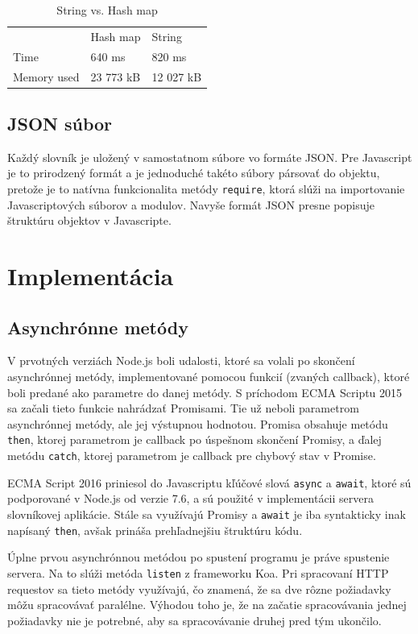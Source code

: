 \documentclass[
  digital, %
  table,   %
  lof,     %
  lot,     %
]{fithesis3}
\begin{document}
\begin{table}[]
\centering
\caption{String vs. Hash map}
\label{tab:string-hash}
\begin{tabular}{lll}
     & Hash map & String   \\
Time & 640 ms   & 820 ms   \\
Memory used & 23 773 kB & 12 027 kB
\end{tabular}
\end{table}

\subsection{JSON súbor}
Každý slovník je uložený v samostatnom súbore vo formáte JSON. Pre Javascript je to prirodzený formát a je jednoduché takéto súbory pársovať do objektu, pretože je to natívna funkcionalita metódy \texttt{require}, ktorá slúži na importovanie Javascriptových súborov a modulov. Navyše formát JSON presne popisuje štruktúru objektov v Javascripte.


\section{Implementácia}
\subsection{Asynchrónne metódy}
V prvotných verziách Node.js boli udalosti, ktoré sa volali po skončení asynchrónnej metódy, implementované pomocou funkcií (zvaných callback), ktoré boli predané ako parametre do danej metódy. S príchodom ECMA Scriptu 2015 sa začali tieto funkcie nahrádzať Promisami. Tie už neboli parametrom asynchrónnej metódy, ale jej výstupnou hodnotou. Promisa obsahuje metódu \texttt{then}, ktorej parametrom je callback po úspešnom skončení Promisy, a ďalej metódu \texttt{catch}, ktorej parametrom je callback pre chybový stav v Promise.

ECMA Script 2016 priniesol do Javascriptu kľúčové slová \texttt{async} a \texttt{await}, ktoré sú podporované v Node.js od verzie 7.6, a sú použité v implementácii servera slovníkovej aplikácie. Stále sa využívajú Promisy a \texttt{await} je iba syntakticky inak napísaný \texttt{then}, avšak prináša prehľadnejšiu štruktúru kódu.

Úplne prvou asynchrónnou metódou po spustení programu je práve spustenie servera. Na to slúži metóda \texttt{listen} z frameworku Koa. Pri spracovaní HTTP requestov sa tieto metódy využívajú, čo znamená, že sa dve rôzne požiadavky môžu spracovávať paralélne. Výhodou toho je, že na začatie spracovávania jednej požiadavky nie je potrebné, aby sa spracovávanie druhej pred tým ukončilo.
\end{document}
